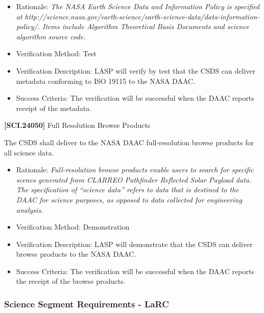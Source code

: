 \documentclass[12pt,oneside,oldfontcommands]{memoir}
\begin{document}
\begin{itemize}
\item{} Rationale: \emph{The NASA Earth Science Data and Information Policy is specified at http:\slash \slash science.nasa.gov\slash earth-science\slash earth-science-data\slash data-information-policy\slash . Items include Algorithm Theoretical Basis Documents and science algorithm source code.}

\item{} Verification Method: Test

\item{} Verification Description: \gls{LASP} will verify by \gls{test} that the \gls{CSDS} can deliver metadata conforming to ISO 19115 to the NASA \gls{DAAC}.

\item{} Success Criteria: The verification will be successful when the \gls{DAAC} reports receipt of the metadata.

\end{itemize}

\textbf{[SCI.24050]} Full Resolution Browse Products

The \gls{CSDS} shall deliver to the NASA \gls{DAAC} full-resolution browse products for all science data.

\begin{itemize}
\item{} Rationale: \emph{Full-resolution browse products enable users to search for specific scenes generated from CLARREO Pathfinder Reflected Solar Payload data. The specification of ``science data'' refers to data that is destined to the DAAC for science purposes, as opposed to data collected for engineering analysis.}

\item{} Verification Method: Demonstration

\item{} Verification Description: \gls{LASP} will demonstrate that the \gls{CSDS} can deliver browse products to the NASA \gls{DAAC}.

\item{} Success Criteria: The verification will be successful when the \gls{DAAC} reports the receipt of the browse products.

\end{itemize}

\subsubsection{Science Segment Requirements - LaRC}
\label{sciencesegmentrequirements-larc}
\end{document}
